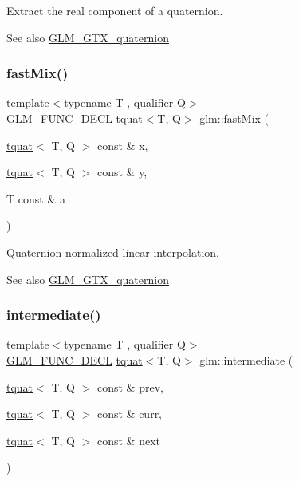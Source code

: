 Extract the real component of a quaternion.

\begin{DoxySeeAlso}{See also}
\mbox{\hyperlink{group__gtx__quaternion}{G\+L\+M\+\_\+\+G\+T\+X\+\_\+quaternion}} 
\end{DoxySeeAlso}
\mbox{\label{group__gtx__quaternion_gac5c77bc74dfc750aaf271d68f271bf2b}} 
\subsubsection{\texorpdfstring{fast\+Mix()}{fastMix()}}
{\footnotesize\ttfamily template$<$typename T , qualifier Q$>$ \\
\mbox{\hyperlink{setup_8hpp_ab2d052de21a70539923e9bcbf6e83a51}{G\+L\+M\+\_\+\+F\+U\+N\+C\+\_\+\+D\+E\+CL}} \mbox{\hyperlink{structglm_1_1tquat}{tquat}}$<$T, Q$>$ glm\+::fast\+Mix (\begin{DoxyParamCaption}\item[{\mbox{\hyperlink{structglm_1_1tquat}{tquat}}$<$ T, Q $>$ const \&}]{x,  }\item[{\mbox{\hyperlink{structglm_1_1tquat}{tquat}}$<$ T, Q $>$ const \&}]{y,  }\item[{T const \&}]{a }\end{DoxyParamCaption})}

Quaternion normalized linear interpolation.

\begin{DoxySeeAlso}{See also}
\mbox{\hyperlink{group__gtx__quaternion}{G\+L\+M\+\_\+\+G\+T\+X\+\_\+quaternion}} 
\end{DoxySeeAlso}
\mbox{\label{group__gtx__quaternion_gac9be2084562a52ae8923813233563a28}} 
\subsubsection{\texorpdfstring{intermediate()}{intermediate()}}
{\footnotesize\ttfamily template$<$typename T , qualifier Q$>$ \\
\mbox{\hyperlink{setup_8hpp_ab2d052de21a70539923e9bcbf6e83a51}{G\+L\+M\+\_\+\+F\+U\+N\+C\+\_\+\+D\+E\+CL}} \mbox{\hyperlink{structglm_1_1tquat}{tquat}}$<$T, Q$>$ glm\+::intermediate (\begin{DoxyParamCaption}\item[{\mbox{\hyperlink{structglm_1_1tquat}{tquat}}$<$ T, Q $>$ const \&}]{prev,  }\item[{\mbox{\hyperlink{structglm_1_1tquat}{tquat}}$<$ T, Q $>$ const \&}]{curr,  }\item[{\mbox{\hyperlink{structglm_1_1tquat}{tquat}}$<$ T, Q $>$ const \&}]{next }\end{DoxyParamCaption})}

